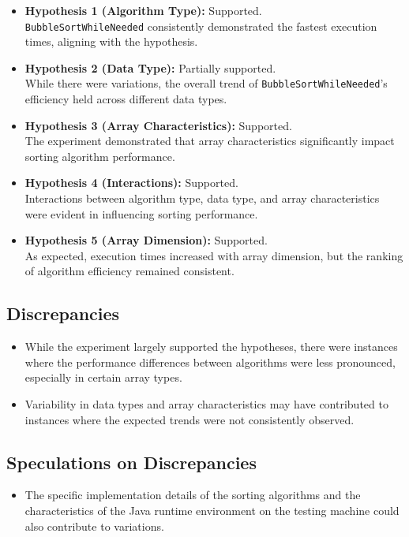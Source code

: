 \documentclass{article}
\begin{document}
\begin{itemize}
    \item \textbf{Hypothesis 1 (Algorithm Type):} Supported.\\ \texttt{BubbleSortWhileNeeded} consistently demonstrated the fastest execution times, aligning with the hypothesis.
    \item \textbf{Hypothesis 2 (Data Type):} Partially supported. \\
    While there were variations, the overall trend of \texttt{BubbleSortWhileNeeded}'s efficiency held across different data types.
    \item \textbf{Hypothesis 3 (Array Characteristics):} Supported. \\
    The experiment demonstrated that array characteristics significantly impact sorting algorithm performance.
    \item \textbf{Hypothesis 4 (Interactions):} Supported. \\
    Interactions between algorithm type, data type, and array characteristics were evident in influencing sorting performance.
    \item \textbf{Hypothesis 5 (Array Dimension):} Supported. \\
    As expected, execution times increased with array dimension, but the ranking of algorithm efficiency remained consistent.
\end{itemize}


\subsection*{Discrepancies}

\begin{itemize}[label=$\bullet$]
    \item While the experiment largely supported the hypotheses, there were instances where the performance differences between algorithms were less pronounced, especially in certain array types.
    \item Variability in data types and array characteristics may have contributed to instances where the expected trends were not consistently observed.
\end{itemize}

\subsection*{Speculations on Discrepancies}

\begin{itemize}[label=$\bullet$]
    \item The specific implementation details of the sorting algorithms and the characteristics of the Java runtime environment on the testing machine could also contribute to variations.
\end{itemize}
\end{document}
